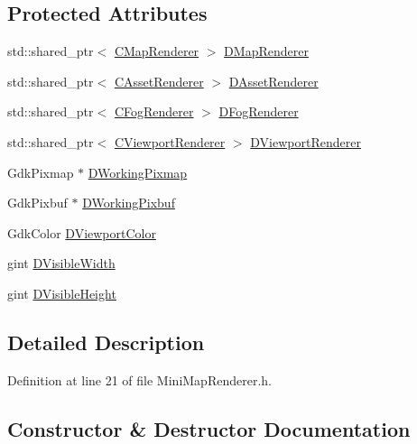 \subsection*{Protected Attributes}
\begin{DoxyCompactItemize}
\item 
std\+::shared\+\_\+ptr$<$ \hyperlink{classCMapRenderer}{C\+Map\+Renderer} $>$ \hyperlink{classCMiniMapRenderer_a6656b208c6b29641a151ea4cbcfda31b}{D\+Map\+Renderer}
\item 
std\+::shared\+\_\+ptr$<$ \hyperlink{classCAssetRenderer}{C\+Asset\+Renderer} $>$ \hyperlink{classCMiniMapRenderer_a352998f61c6777ccb3969712b8e691d9}{D\+Asset\+Renderer}
\item 
std\+::shared\+\_\+ptr$<$ \hyperlink{classCFogRenderer}{C\+Fog\+Renderer} $>$ \hyperlink{classCMiniMapRenderer_a51a715ce4773d3fa3f433a282632035c}{D\+Fog\+Renderer}
\item 
std\+::shared\+\_\+ptr$<$ \hyperlink{classCViewportRenderer}{C\+Viewport\+Renderer} $>$ \hyperlink{classCMiniMapRenderer_a36d2e3446baba2607129c673311d3420}{D\+Viewport\+Renderer}
\item 
Gdk\+Pixmap $\ast$ \hyperlink{classCMiniMapRenderer_a53bf622d2048ea136ae256e8d4b81fb5}{D\+Working\+Pixmap}
\item 
Gdk\+Pixbuf $\ast$ \hyperlink{classCMiniMapRenderer_ad5f723d83a60882a3e82af72e84ff522}{D\+Working\+Pixbuf}
\item 
Gdk\+Color \hyperlink{classCMiniMapRenderer_a6a4f56052a4ced356448f5f1cc9a465e}{D\+Viewport\+Color}
\item 
gint \hyperlink{classCMiniMapRenderer_aedcb790a697e6f606cd7fa5089a41359}{D\+Visible\+Width}
\item 
gint \hyperlink{classCMiniMapRenderer_aad56353e51a1a3da66d3428cf0f1ccf8}{D\+Visible\+Height}
\end{DoxyCompactItemize}


\subsection{Detailed Description}


Definition at line 21 of file Mini\+Map\+Renderer.\+h.



\subsection{Constructor \& Destructor Documentation}
\hypertarget{classCMiniMapRenderer_a6ed3c6e7e2352ac9278493eb71ddc60c}{}\label{classCMiniMapRenderer_a6ed3c6e7e2352ac9278493eb71ddc60c} 
